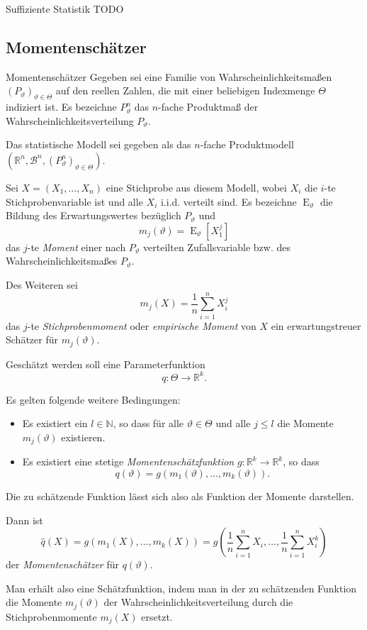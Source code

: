 \begin{defi}{Suffiziente Statistik}
    TODO
\end{defi}

\subsection{Momentenschätzer}

\begin{defi}{Momentenschätzer}
    Gegeben sei eine Familie von Wahrscheinlichkeitsmaßen $(P_{\vartheta})_{\vartheta \in \Theta}$ auf den reellen Zahlen, die mit einer beliebigen Indexmenge $\Theta$ indiziert ist.
    Es bezeichne $P_{\vartheta}^n$ das $n$-fache Produktmaß der Wahrscheinlichkeitsverteilung $P_{\vartheta}$.

    Das statistische Modell sei gegeben als das $n$-fache Produktmodell $(\mathbb{R}^n, \mathcal{B}^n, (P_{\vartheta}^n)_{\vartheta \in \Theta})$.

    Sei $X = (X_1, \dotsc, X_n)$ eine Stichprobe aus diesem Modell, wobei $X_i$ die $i$-te Stichprobenvariable ist und alle $X_i$ i.i.d. verteilt sind.
    Es bezeichne $\operatorname{E}_{\vartheta}$ die Bildung des Erwartungswertes bezüglich $P_{\vartheta}$ und
    \[
        m_j(\vartheta) = \operatorname{E}_{\vartheta}[X_1^j]
    \]
    das $j$-te \emph{Moment} einer nach $P_{\vartheta}$ verteilten Zufallsvariable bzw. des Wahrscheinlichkeitsmaßes $P_{\vartheta}$.

    Des Weiteren sei
    \[
        m_j(X) = \frac{1}{n} \sum_{i=1}^n X_i^j
    \]
    das $j$-te \emph{Stichprobenmoment} oder \emph{empirische Moment} von $X$ ein erwartungstreuer Schätzer für $m_j(\vartheta)$.

    Geschätzt werden soll eine Parameterfunktion
    \[
        q: \Theta \to \mathbb{R}^k.
    \]

    Es gelten folgende weitere Bedingungen:
    \begin{itemize}
        \item Es existiert ein $l \in \mathbb{N}$, so dass für alle $\vartheta \in \Theta$ und alle $j \leq l$ die Momente $m_j(\vartheta)$ existieren.
        \item Es existiert eine stetige \emph{Momentenschätzfunktion} $g: \mathbb{R}^k \to \mathbb{R}^k$, so dass
              \[
                  q(\vartheta) = g(m_1(\vartheta), \dotsc, m_k(\vartheta)).
              \]
    \end{itemize}
    Die zu schätzende Funktion lässt sich also als Funktion der Momente darstellen.

    Dann ist
    \[
        \hat{q}(X) = g(m_1(X), \dotsc, m_k(X)) = g\left( \frac{1}{n} \sum_{i=1}^n X_i, \dotsc, \frac{1}{n} \sum_{i=1}^n X_i^k \right)
    \]
    der \emph{Momentenschätzer} für $q(\vartheta)$.

    Man erhält also eine Schätzfunktion, indem man in der zu schätzenden Funktion die Momente $m_j(\vartheta)$ der Wahrscheinlichkeitsverteilung durch die Stichprobenmomente $m_j(X)$ ersetzt.
\end{defi}

